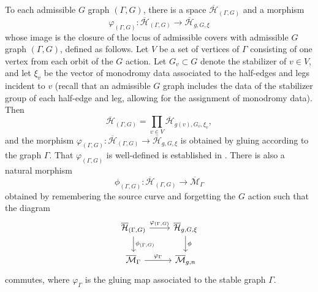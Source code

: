 \documentclass[12pt]{amsart}
\theoremstyle{definition}
\newcommand{\Hb}{\overline{\mathcal{H}}}
\newcommand{\M}{\mathcal{M}}
\newcommand{\Mb}{\overline{\M}}
\begin{document}
 To each admissible $G$ graph $(\Gamma,G)$, there is a space $\Hb_{(\Gamma,G)}$ and a morphism
 \[
 \varphi_{(\Gamma,G)}:\Hb_{(\Gamma,G)}\rightarrow \Hb_{g,G,\xi}
 \]
 whose image is the closure of the locus of admissible covers with admissible $G$ graph $(\Gamma,G)$, defined as follows. Let $V$ be a set of vertices of $\Gamma$ consisting of one vertex from each orbit of the $G$ action. Let $G_v\subset G$ denote the stabilizer of $v\in V$, and let $\xi_{v}$ be the vector of monodromy data associated to the half-edges and legs incident to $v$ (recall that an admissible $G$ graph includes the data of the stabilizer group of each half-edge and leg, allowing for the assignment of monodromy data). Then
 \[
 \Hb_{(\Gamma,G)}=\prod_{v\in V} \Hb_{g(v),G_v,\xi_{v}},
 \]
and the morphism $\varphi_{(\Gamma,G)}:\Hb_{(\Gamma,G)}\rightarrow \Hb_{g,G,\xi}$ is obtained by gluing according to the graph $\Gamma$. That $\varphi_{(\Gamma,G)}$ is well-defined is established in \cite[Page 30]{SvZ}. There is also a natural morphism
\[
\phi_{(\Gamma,G)}:\Hb_{(\Gamma,G)}\rightarrow \Mb_{\Gamma}
\]
obtained by remembering the source curve and forgetting the $G$ action such that the diagram
\[
\begin{tikzcd}
{\Hb_{(\Gamma,G)}} \arrow[r, "{\varphi_{(\Gamma,G)}}"] \arrow[d, "{\phi_{(\Gamma,G)}}"] & {\Hb_{g,G,\xi}} \arrow[d, "\phi"] \\
\Mb_{\Gamma} \arrow[r, "\varphi_{\Gamma}"]                                              & {\Mb_{g,n}}                     
\end{tikzcd}
\]
commutes, where $\varphi_{\Gamma}$ is the gluing map associated to the stable graph $\Gamma$. 
\end{document}

